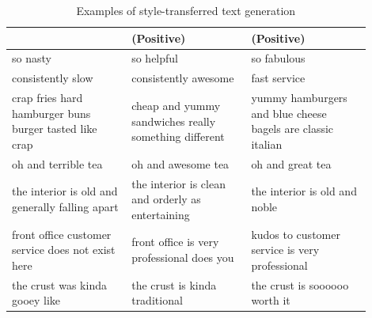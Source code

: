\begin{table}[ht]
\begin{tabular}{| p{0.3\linewidth} | p{0.3\linewidth} | p{0.3\linewidth} |}
		                                                       & \textbf{(Positive)}                                            & \textbf{(Positive)}                                         \\
		\hline
		\hline
		so nasty                                               & so helpful                                                     & so fabulous                                                 \\
		\hline
		consistently slow                                      & consistently awesome                                           & fast service                                                \\
		\hline
		crap fries hard hamburger buns burger tasted like crap & cheap and yummy sandwiches really something different          & yummy hamburgers and blue cheese bagels are classic italian \\
		\hline
		oh and terrible tea                                    & oh and awesome tea                                             & oh and great tea                                            \\
		\hline
		the interior is old and generally falling apart        & the interior is clean and orderly as entertaining              & the interior is old and noble                               \\
		\hline
		front office customer service does not exist here      & front office is very professional does you                     & kudos to customer service is very professional              \\
		\hline
		the crust was kinda gooey like                         & the crust is kinda traditional                                 & the crust is soooooo worth it                               \\
		\hline
	\end{tabular}
	\caption{Examples of style-transferred text generation}
	\label{tab:transfer-samples}
\end{table}
